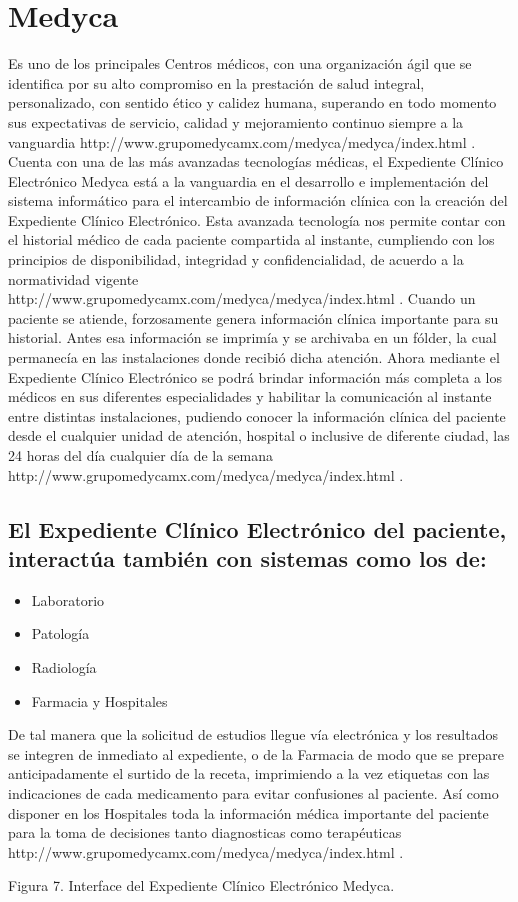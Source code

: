 \section{Medyca}
Es uno de los principales Centros médicos, con una organización ágil que se identifica por su alto compromiso en la prestación de salud integral, personalizado, con sentido ético y calidez humana, superando en todo momento sus expectativas de servicio, calidad y mejoramiento continuo siempre a la vanguardia http://www.grupomedycamx.com/medyca/medyca/index.html .
Cuenta con una de las más avanzadas tecnologías médicas, el Expediente Clínico Electrónico Medyca está a la vanguardia en el desarrollo e implementación del sistema informático para el intercambio de información clínica con la creación del Expediente Clínico Electrónico. Esta avanzada tecnología nos permite contar con el historial médico de cada paciente compartida al instante, cumpliendo con los principios de disponibilidad, integridad y confidencialidad, de acuerdo a la normatividad vigente http://www.grupomedycamx.com/medyca/medyca/index.html .
Cuando un paciente se atiende, forzosamente genera información clínica importante para su historial. Antes esa información se imprimía y se archivaba en un fólder, la cual permanecía en las instalaciones donde recibió dicha atención.
Ahora mediante el Expediente Clínico Electrónico se podrá brindar información más completa a los médicos en sus diferentes especialidades y habilitar la comunicación al instante entre distintas instalaciones, pudiendo conocer la información clínica del paciente desde el cualquier unidad de atención, hospital o inclusive de diferente ciudad, las 24 horas del día cualquier día de la semana http://www.grupomedycamx.com/medyca/medyca/index.html .

\subsection{El Expediente Clínico Electrónico del paciente, interactúa también con sistemas como los de:}
\begin{itemize}
  \item Laboratorio
  \item Patología
  \item Radiología
  \item Farmacia y Hospitales
\end{itemize}

De tal manera que la solicitud de estudios llegue vía electrónica y los resultados se integren de inmediato al expediente, o de la Farmacia de modo que se prepare anticipadamente el surtido de la receta, imprimiendo a la vez etiquetas con las indicaciones de cada medicamento para evitar confusiones al paciente.
Así como disponer en los Hospitales toda la información médica importante del paciente para la toma de decisiones tanto diagnosticas como terapéuticas http://www.grupomedycamx.com/medyca/medyca/index.html .




				Figura 7. Interface del Expediente Clínico Electrónico Medyca.
